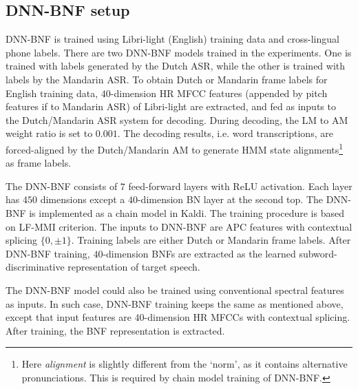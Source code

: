 \documentclass[a4paper]{article}
\begin{document}
\subsection{DNN-BNF setup}
DNN-BNF is trained using Libri-light (English) training data and cross-lingual phone labels. 
There are two DNN-BNF models trained in the experiments. One is trained with labels generated by the Dutch ASR, while the other is trained with labels by the Mandarin ASR. To obtain Dutch or Mandarin frame labels for English training data, $40$-dimension HR MFCC features (appended by pitch features if to Mandarin ASR) of Libri-light are extracted, and fed as inputs to the Dutch/Mandarin ASR system for decoding. 
During decoding, the LM to AM weight ratio is set to $0.001$.
The decoding results, i.e. word transcriptions,  are  forced-aligned by the Dutch/Mandarin AM to generate HMM state alignments\footnote{Here \textit{alignment} is slightly different from the `norm', as it contains alternative pronunciations. This is required by chain model training of DNN-BNF.} as frame labels.

The DNN-BNF consists of $7$ feed-forward layers with ReLU activation. Each layer has $450$ dimensions except a $40$-dimension BN layer at the second top. The DNN-BNF is implemented  as a chain model in Kaldi. The training procedure  is based on  LF-MMI criterion. 
The inputs to DNN-BNF are APC  features with contextual splicing $\{0,\pm 1\}$.
Training labels are either Dutch  or Mandarin frame labels. After DNN-BNF training, $40$-dimension BNFs are extracted as the learned subword-discriminative representation of target speech. 




The DNN-BNF model could also be trained using conventional spectral features as inputs. 
In such case, DNN-BNF training keeps the same as mentioned above, except that input features are $40$-dimension HR MFCCs with contextual splicing. After training, the BNF representation is   extracted.
\end{document}
